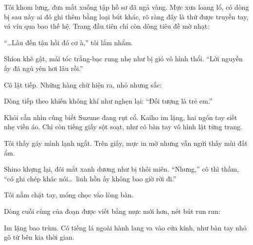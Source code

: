 \documentclass[../main.tex]{subfiles}
\begin{document}
Tôi khom lưng, đưa mắt xuống tập hồ sơ đã ngả vàng. Mực xưa loang lổ, có dòng bị sau này ai đó ghi thêm bằng loại bút khác, rõ ràng đây là thứ được truyền tay, vá víu qua bao thế hệ. Trang đầu tiên chỉ còn dòng tiêu đề mờ nhạt:


``\dots Lâu đến tận hồi đó cơ à,'' tôi lẩm nhẩm.

Shion khẽ gật, mái tóc trắng-bạc rung nhẹ như bị gió vô hình thổi. ``Lời nguyền ấy đã ngủ yên hơi lâu rồi.''

Cô lật tiếp. Những hàng chữ hiện ra, nhỏ nhưng sắc:


Dòng tiếp theo khiến không khí như nghẹn lại: ``Đối tượng là trẻ em.''

Khỏi cần nhìn cũng biết Suzune đang rụt cổ. Kaiho im lặng, hai ngón tay siết nhẹ viền áo. Chỉ còn tiếng giấy sột soạt, như có bàn tay vô hình lật từng trang.


Tôi thấy gáy mình lạnh ngắt. Trên giấy, mực in mờ nhưng vẫn ngửi thấy mùi đất ẩm.


Shino khựng lại, đôi mắt xanh dương như bị thôi miên. ``Nhưng,'' cô thì thầm, ``có ghi chép khác nói\dots\ linh hồn ấy không bao giờ rời đi.''

Tôi nắm chặt tay, móng chọc vào lòng bàn.


Dòng cuối cùng của đoạn được viết bằng mực mới hơn, nét bút run run:


Im lặng bao trùm. Có tiếng lá ngoài hành lang va vào cửa kính, như bàn tay nhỏ gõ từ bên kia thời gian.
\end{document}
